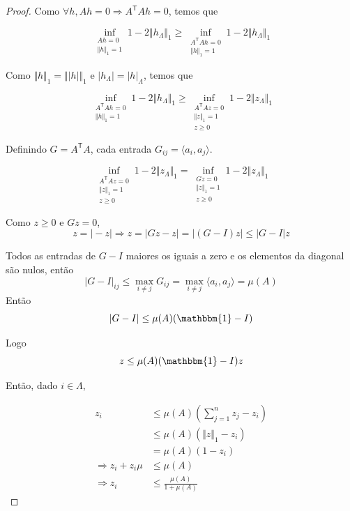 \begin{proof}
Como $\forall h, Ah = 0 \Rightarrow A^{\mathsf{T}} A h = 0$, temos que

$$ \inf_{\substack{Ah = 0 \\ \Vert h \Vert_1 = 1}} 1 - 2 \Vert h_\Lambda \Vert_1
\geq \inf_{\substack{A^{\mathsf{T}}Ah = 0 \\ \Vert h \Vert_1 = 1}} 1 - 2 \Vert h_\Lambda \Vert_1$$

Como $ \Vert h \Vert_1 = \Vert \vert h \vert \Vert_1$ e $\vert h_\Lambda \vert = \vert h \vert_\Lambda$, temos que

$$\inf_{\substack{A^{\mathsf{T}}Ah = 0 \\ \Vert h \Vert_1 = 1}} 1 - 2 \Vert h_\Lambda \Vert_1
\geq \inf_{\substack{A^{\mathsf{T}}Az = 0 \\ \Vert z \Vert_1 = 1 \\ z \geq 0}}
1 - 2 \Vert z_\Lambda \Vert_1$$

Definindo $G = A^{\mathsf{T}}A$, cada entrada $G_{ij} = \langle a_i, a_j \rangle$.

$$\inf_{\substack{A^{\mathsf{T}}Az = 0 \\ \Vert z \Vert_1 = 1 \\ z \geq 0}}
1 - 2 \Vert z_\Lambda \Vert_1
=
\inf_{\substack{Gz = 0 \\ \Vert z \Vert_1 = 1 \\ z \geq 0}}
1 - 2 \Vert z_\Lambda \Vert_1$$

Como $z \geq 0$ e $Gz = 0$,
$$ z = \vert -z \vert \Rightarrow z = \vert Gz - z \vert
= \vert (G - I)z \vert \leq \vert G - I \vert z
$$

Todos as entradas de $G - I$ maiores os iguais a zero e os elementos da diagonal são nulos, então
$$ \vert G - I \vert_{ij} \leq \max_{i \neq j} G_{ij} = \max_{i \neq j} \langle a_i, a_j \rangle = \mu(A)$$
Então
$$ \vert G - I \vert \leq \mu(A) (\mathbbm{1} - I)$$

Logo
$$ z \leq \mu(A) (\mathbbm{1} - I) z$$

Então, dado $i \in \Lambda$,

\begin{subequations}
\begin{align*}
z_i & \leq \mu(A) \left( \sum_{j = 1}^n z_j - z_i \right) \\
& \leq \mu(A) (\Vert z \Vert_1  - z_i) \\
& = \mu(A)(1 - z_i) \\
\Rightarrow z_i + z_i\mu & \leq \mu(A)\\
\Rightarrow z_i &\leq \frac{\mu(A)}{1 + \mu(A)}
\end{align*}
\end{subequations}


\end{proof}

